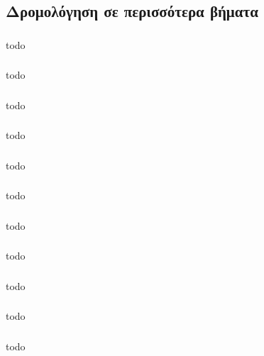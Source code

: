 \documentclass[a4paper, 12pt]{article}
\begin{document}
	\subsection{Δρομολόγηση σε περισσότερα βήματα}

		\subsubsection{}
			todo

		\subsubsection{}
			todo

		\subsubsection{}
			todo

		\subsubsection{}
			todo

		\subsubsection{}
			todo

		\subsubsection{}
			todo

		\subsubsection{}
			todo

		\subsubsection{}
			todo

		\subsubsection{}
			todo

		\subsubsection{}
			todo

		\subsubsection{}
			todo
\end{document}
